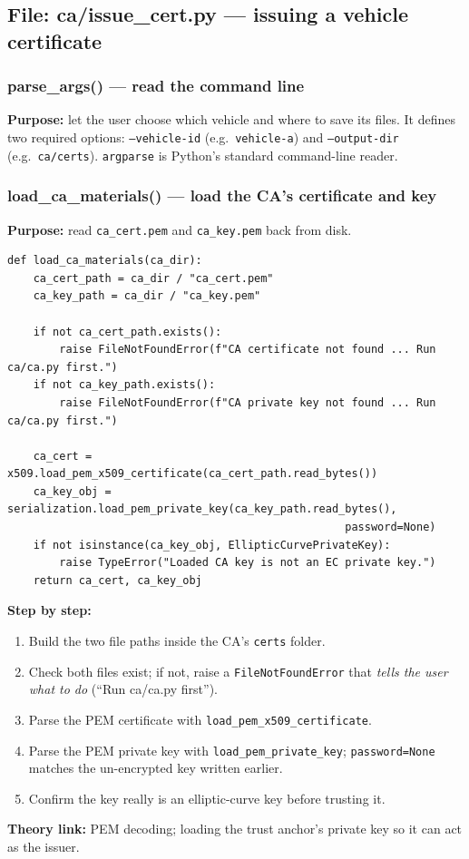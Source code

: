 \documentclass[11pt,a4paper]{report}
\begin{document}
\subsection{File: ca/issue\_cert.py --- issuing a vehicle certificate}

\subsubsection*{parse\_args() --- read the command line}
\textbf{Purpose:} let the user choose which vehicle and where to save its files.
It defines two required options: \texttt{--vehicle-id} (e.g.\ \texttt{vehicle-a})
and \texttt{--output-dir} (e.g.\ \texttt{ca/certs}). \texttt{argparse} is
Python's standard command-line reader.

\subsubsection*{load\_ca\_materials() --- load the CA's certificate and key}
\textbf{Purpose:} read \texttt{ca\_cert.pem} and \texttt{ca\_key.pem} back from disk.
\begin{lstlisting}[style=py,caption={ca/issue\_cert.py --- load the CA so we can sign with it.}]
def load_ca_materials(ca_dir):
    ca_cert_path = ca_dir / "ca_cert.pem"
    ca_key_path = ca_dir / "ca_key.pem"

    if not ca_cert_path.exists():
        raise FileNotFoundError(f"CA certificate not found ... Run ca/ca.py first.")
    if not ca_key_path.exists():
        raise FileNotFoundError(f"CA private key not found ... Run ca/ca.py first.")

    ca_cert = x509.load_pem_x509_certificate(ca_cert_path.read_bytes())
    ca_key_obj = serialization.load_pem_private_key(ca_key_path.read_bytes(),
                                                    password=None)
    if not isinstance(ca_key_obj, EllipticCurvePrivateKey):
        raise TypeError("Loaded CA key is not an EC private key.")
    return ca_cert, ca_key_obj
\end{lstlisting}
\textbf{Step by step:}
\begin{enumerate}
  \item Build the two file paths inside the CA's \texttt{certs} folder.
  \item Check both files exist; if not, raise a \texttt{FileNotFoundError} that
        \emph{tells the user what to do} (``Run ca/ca.py first'').
  \item Parse the PEM certificate with \texttt{load\_pem\_x509\_certificate}.
  \item Parse the PEM private key with \texttt{load\_pem\_private\_key};
        \texttt{password=None} matches the un-encrypted key written earlier.
  \item Confirm the key really is an elliptic-curve key before trusting it.
\end{enumerate}
\textbf{Theory link:} PEM decoding; loading the trust anchor's private key so it
can act as the issuer.
\end{document}
